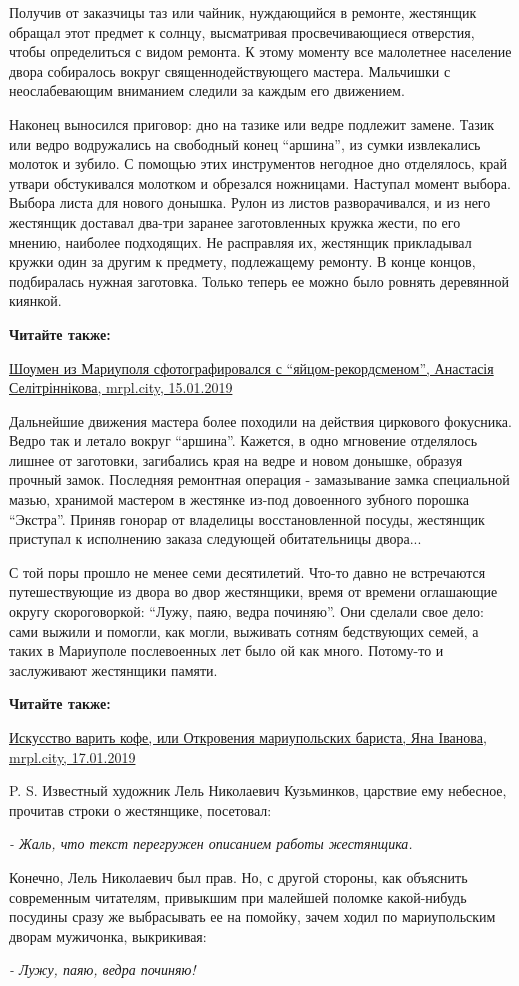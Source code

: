 Получив от заказчицы таз или чайник, нуждающийся в ремонте, жестянщик обращал
этот предмет к солнцу, высматривая просвечивающиеся отверстия, чтобы
определиться с видом ремонта. К этому моменту все малолетнее население двора
собиралось вокруг священнодействующего мастера. Мальчишки с неослабевающим
вниманием следили за каждым его движением.

Наконец выносился приговор: дно на тазике или ведре подлежит замене. Тазик или
ведро водружались на свободный конец \enquote{аршина}, из сумки извлекались молоток и
зубило. С помощью этих инструментов негодное дно отделялось, край утвари
обстукивался молотком и обрезался ножницами. Наступал момент выбора. Выбора
листа для нового донышка. Рулон из листов разворачивался, и из него жестянщик
доставал два-три заранее заготовленных кружка жести, по его мнению, наиболее
подходящих. Не расправляя их, жестянщик прикладывал кружки один за другим к
предмету, подлежащему ремонту. В конце концов, подбиралась нужная заготовка.
Только теперь ее можно было ровнять деревянной киянкой.

\textbf{Читайте также:} 

\href{https://mrpl.city/news/view/shoumen-iz-mariupolya-sfotografirovalsya-s-yajtsom-rekordsmenom}{%
Шоумен из Мариуполя сфотографировался с \enquote{яйцом-рекордсменом}, Анастасія Селітріннікова, mrpl.city, 15.01.2019}

Дальнейшие движения мастера более походили на действия циркового фокусника.
Ведро так и летало вокруг \enquote{аршина}. Кажется, в одно мгновение отделялось лишнее
от заготовки, загибались края на ведре и новом донышке, образуя прочный замок.
Последняя ремонтная операция - замазывание замка специальной мазью, хранимой
мастером в жестянке из-под довоенного зубного порошка \enquote{Экстра}. Приняв гонорар
от владелицы восстановленной посуды, жестянщик приступал к исполнению заказа
следующей обитательницы двора...

С той поры прошло не менее семи десятилетий. Что-то давно не встречаются
путешествующие из двора во двор жестянщики, время от времени оглашающие округу
скороговоркой: \enquote{Лужу, паяю, ведра починяю}. Они сделали свое дело: сами выжили
и помогли, как могли, выживать сотням бедствующих семей, а таких в Мариуполе
послевоенных лет было ой как много. Потому-то и заслуживают жестянщики памяти.

\textbf{Читайте также:} 

\href{https://mrpl.city/news/view/iskusstvo-varit-kofe-ili-otkroveniya-mariupolskih-barista-foto-plusvideo}{%
Искусство варить кофе, или Откровения мариупольских бариста, Яна Іванова, mrpl.city, 17.01.2019}

P. S. Известный художник Лель Николаевич Кузьминков, царствие ему небесное,
прочитав строки о жестянщике, посетовал:

\emph{- Жаль, что текст перегружен описанием работы жестянщика.}

Конечно, Лель Николаевич был прав. Но, с другой стороны, как объяснить
современным читателям, привыкшим при малейшей поломке какой-нибудь посудины
сразу же выбрасывать ее на помойку, зачем ходил по мариупольским дворам
мужичонка, выкрикивая:

\emph{- Лужу, паяю, ведра починяю!}
